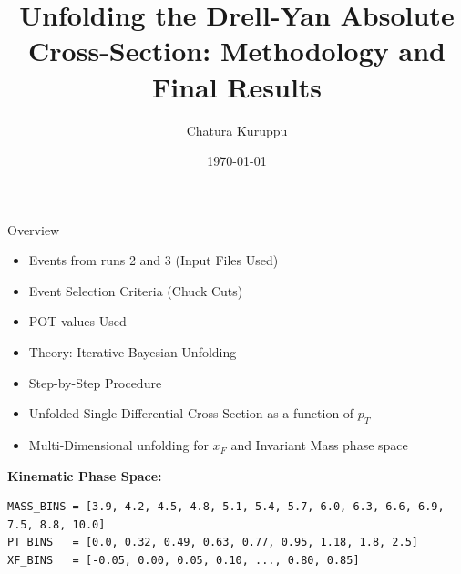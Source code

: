 \documentclass[aspectratio=169]{beamer}
\title[Higher Dimensional Unfolding]{Unfolding the Drell-Yan Absolute Cross-Section: Methodology and Final Results}
\author{Chatura Kuruppu}
\institute{New Mexico State University\\ \vspace{0.1cm} SeaQuest Experiment (E906)}
\date{\today}
\begin{document}
\begin{frame}
    \titlepage
\end{frame}

\begin{frame}[fragile]{Overview}
    \begin{itemize}
        \item Events from runs 2 and 3 (Input Files Used)
        \item Event Selection Criteria (Chuck Cuts)
        \item POT values Used
        \item Theory: Iterative Bayesian Unfolding
        \item Step-by-Step Procedure
        \item Unfolded Single Differential Cross-Section as a function of $p_T$
        \item Multi-Dimensional unfolding for $x_F$ and Invariant Mass phase space
    \end{itemize}
    
    \vspace{0.3cm}
    \textbf{Kinematic Phase Space:}
    \begin{small}
    \begin{verbatim}
MASS_BINS = [3.9, 4.2, 4.5, 4.8, 5.1, 5.4, 5.7, 6.0, 6.3, 6.6, 6.9, 7.5, 8.8, 10.0]
PT_BINS   = [0.0, 0.32, 0.49, 0.63, 0.77, 0.95, 1.18, 1.8, 2.5]
XF_BINS   = [-0.05, 0.00, 0.05, 0.10, ..., 0.80, 0.85]
    \end{verbatim}
    \end{small}
\end{frame}
\end{document}
